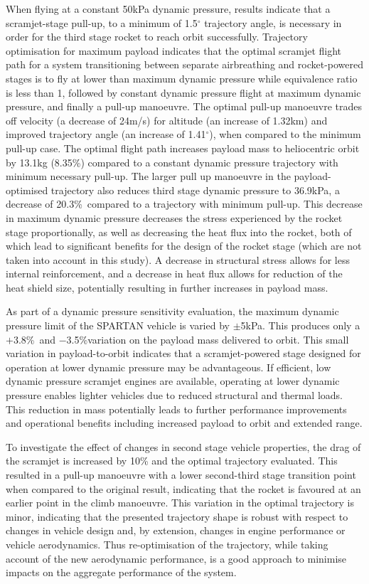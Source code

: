 \documentclass[]{aiaa-tc}
\newcommand{\PayloadImprovement}{8.35\%}
\newcommand{\qDecrease}{20.3\%}
\newcommand{\qVariationPlus}{$+$3.8\%}
\newcommand{\qVariationMinus}{$-$3.5\%}
\newcommand{\SeparationAngleConstq}{1.5}
\newcommand{\SeparationqFiftykPa}{36.9}
\begin{document}
   When flying at a constant 50kPa dynamic pressure, results indicate that a scramjet-stage pull-up, to a minimum of \SeparationAngleConstq $^\circ$ trajectory angle, is necessary in order for the third stage rocket to reach orbit successfully. Trajectory optimisation for maximum payload indicates that the optimal scramjet flight path for a system transitioning between separate airbreathing and rocket-powered stages is to fly at lower than maximum dynamic pressure while equivalence ratio is less than 1, followed by constant dynamic pressure flight at maximum dynamic pressure, and finally a pull-up manoeuvre. The optimal pull-up manoeuvre trades off velocity (a decrease of 24m/s) for altitude (an increase of 1.32km) and improved trajectory angle (an increase of 1.41$^\circ$), when compared to the minimum pull-up case. The optimal flight path increases payload mass to heliocentric orbit by 13.1kg (\PayloadImprovement) compared to a constant dynamic pressure trajectory with minimum necessary pull-up. The larger pull up manoeuvre in the payload-optimised trajectory also reduces third stage dynamic pressure to \SeparationqFiftykPa kPa, a decrease of \qDecrease\ compared to a trajectory with minimum pull-up. This decrease in maximum dynamic pressure decreases the stress experienced by the rocket stage proportionally, as well as decreasing the heat flux into the rocket, both of which lead to significant benefits for the design of the rocket stage (which are not taken into account in this study). A decrease in structural stress allows for less internal reinforcement, and a decrease in heat flux allows for reduction of the heat shield size, potentially resulting in further increases in payload mass.
  

As part of a dynamic pressure sensitivity evaluation, the maximum dynamic pressure limit of the SPARTAN vehicle is varied by $\pm$5kPa. This produces only a \qVariationPlus\ and \qVariationMinus \space variation on the payload mass delivered to orbit. This small variation in payload-to-orbit indicates that a scramjet-powered stage designed for operation at lower dynamic pressure may be advantageous.
If efficient, low dynamic pressure scramjet engines are available, operating at lower dynamic pressure enables lighter vehicles due to reduced structural and thermal loads. This reduction in mass potentially leads to further performance improvements and operational benefits including increased payload to orbit and extended range.
 
 To investigate the effect of changes in second stage vehicle properties, the drag of the scramjet is increased by 10\% and the optimal trajectory evaluated. This resulted in a pull-up manoeuvre with a lower second-third stage transition point when compared to the original result, indicating that the rocket is favoured at an earlier point in the climb manoeuvre. This variation in the optimal trajectory is minor, indicating that the presented trajectory shape is robust with respect to changes in vehicle design and, by extension, changes in engine performance or vehicle aerodynamics. Thus re-optimisation of the trajectory, while taking account of the new aerodynamic performance, is a good approach to minimise impacts on the aggregate performance of the system.
\end{document}
